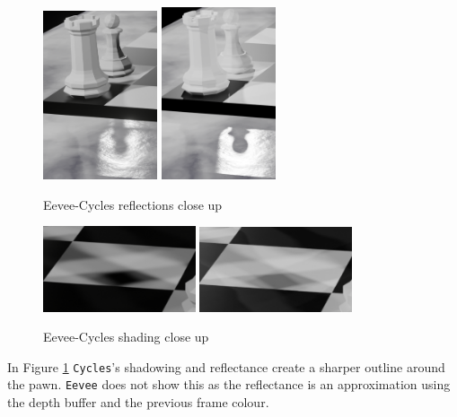 \documentclass[11pt]{article}
\begin{document}
\begin{figure}[htbp]
\begin{center}
\includegraphics[width=0.3\textwidth]{Images/reflections-eevee-1.png}
\includegraphics[width=0.3\textwidth]{Images/reflections-cycles-1.png}
\end{center}
\caption{\label{reflections-close}Eevee-Cycles reflections close up}
\end{figure}
\begin{figure}[htbp]
\begin{center}
\includegraphics[width=0.4\textwidth]{Images/reflections-eevee-2.png}
\includegraphics[width=0.4\textwidth]{Images/reflections-cycles-2.png}
\end{center}
\caption{\label{shading-close}Eevee-Cycles shading close up}
\end{figure}
\newpage
In Figure \ref{reflections-close} \texttt{Cycles}'s shadowing and reflectance create a
sharper outline around the pawn. \texttt{Eevee} does not show this as the reflectance
is an approximation using the depth buffer and the previous frame colour.\\
\end{document}
